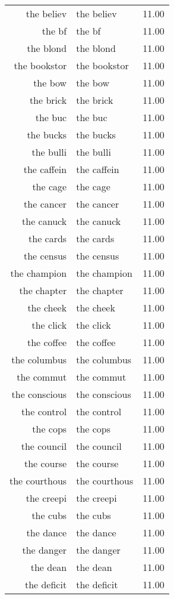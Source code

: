 \begin{table}[ht]
\begin{tabular}{rlr}
  the believ & the believ & 11.00 \\ 
  the bf & the bf & 11.00 \\ 
  the blond & the blond & 11.00 \\ 
  the bookstor & the bookstor & 11.00 \\ 
  the bow & the bow & 11.00 \\ 
  the brick & the brick & 11.00 \\ 
  the buc & the buc & 11.00 \\ 
  the bucks & the bucks & 11.00 \\ 
  the bulli & the bulli & 11.00 \\ 
  the caffein & the caffein & 11.00 \\ 
  the cage & the cage & 11.00 \\ 
  the cancer & the cancer & 11.00 \\ 
  the canuck & the canuck & 11.00 \\ 
  the cards & the cards & 11.00 \\ 
  the census & the census & 11.00 \\ 
  the champion & the champion & 11.00 \\ 
  the chapter & the chapter & 11.00 \\ 
  the cheek & the cheek & 11.00 \\ 
  the click & the click & 11.00 \\ 
  the coffee & the coffee & 11.00 \\ 
  the columbus & the columbus & 11.00 \\ 
  the commut & the commut & 11.00 \\ 
  the conscious & the conscious & 11.00 \\ 
  the control & the control & 11.00 \\ 
  the cops & the cops & 11.00 \\ 
  the council & the council & 11.00 \\ 
  the course & the course & 11.00 \\ 
  the courthous & the courthous & 11.00 \\ 
  the creepi & the creepi & 11.00 \\ 
  the cubs & the cubs & 11.00 \\ 
  the dance & the dance & 11.00 \\ 
  the danger & the danger & 11.00 \\ 
  the dean & the dean & 11.00 \\ 
  the deficit & the deficit & 11.00 \\ 

\end{tabular}
\end{table}

